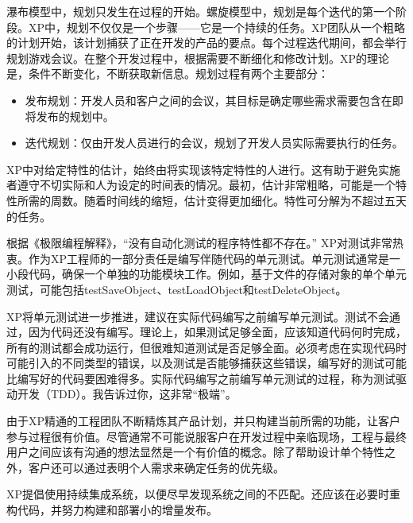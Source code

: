 
瀑布模型中，规划只发生在过程的开始。螺旋模型中，规划是每个迭代的第一个阶段。XP中，规划不仅仅是一个步骤——它是一个持续的任务。XP团队从一个粗略的计划开始，该计划捕获了正在开发的产品的要点。每个过程迭代期间，都会举行规划游戏会议。在整个开发过程中，根据需要不断细化和修改计划。XP的理论是，条件不断变化，不断获取新信息。规划过程有两个主要部分：

\begin{itemize}
\item
发布规划：开发人员和客户之间的会议，其目标是确定哪些需求需要包含在即将发布的规划中。

\item
迭代规划：仅由开发人员进行的会议，规划了开发人员实际需要执行的任务。
\end{itemize}

XP中对给定特性的估计，始终由将实现该特定特性的人进行。这有助于避免实施者遵守不切实际和人为设定的时间表的情况。最初，估计非常粗略，可能是一个特性所需的周数。随着时间线的缩短，估计变得更加细化。特性可分解为不超过五天的任务。


根据《极限编程解释》，“没有自动化测试的程序特性都不存在。” XP对测试非常热衷。作为XP工程师的一部分责任是编写伴随代码的单元测试。单元测试通常是一小段代码，确保一个单独的功能模块工作。例如，基于文件的存储对象的单个单元测试，可能包括testSaveObject、testLoadObject和testDeleteObject。

XP将单元测试进一步推进，建议在实际代码编写之前编写单元测试。测试不会通过，因为代码还没有编写。理论上，如果测试足够全面，应该知道代码何时完成，所有的测试都会成功运行，但很难知道测试是否足够全面。必须考虑在实现代码时可能引入的不同类型的错误，以及测试是否能够捕获这些错误，编写好的测试可能比编写好的代码要困难得多。实际代码编写之前编写单元测试的过程，称为测试驱动开发（TDD）。我告诉过你，这非常“极端”。


由于XP精通的工程团队不断精炼其产品计划，并只构建当前所需的功能，让客户参与过程很有价值。尽管通常不可能说服客户在开发过程中亲临现场，工程与最终用户之间应该有沟通的想法显然是一个有价值的概念。除了帮助设计单个特性之外，客户还可以通过表明个人需求来确定任务的优先级。


XP提倡使用持续集成系统，以便尽早发现系统之间的不匹配。还应该在必要时重构代码，并努力构建和部署小的增量发布。


